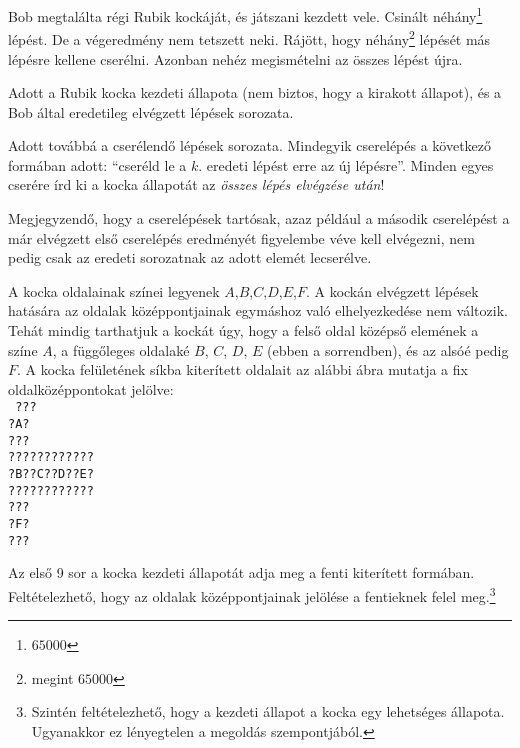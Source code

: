 





Bob megtalálta régi Rubik kockáját, és játszani kezdett vele. Csinált néhány\footnote{$65000$} lépést. De a végeredmény nem tetszett neki. Rájött, hogy néhány\footnote{megint $65000$} lépését más lépésre kellene cserélni. Azonban nehéz megismételni az összes lépést újra.


Adott a Rubik kocka kezdeti állapota (nem biztos, hogy a kirakott állapot), és a Bob által eredetileg elvégzett lépések sorozata.

Adott továbbá a cserélendő lépések sorozata. Mindegyik cserelépés a következő formában adott: ``cseréld le a $k$. eredeti lépést erre az új lépésre''. Minden egyes cserére írd ki a kocka állapotát az \emph{összes lépés elvégzése után}!

Megjegyzendő, hogy a cserelépések tartósak, azaz például a második cserelépést a már elvégzett első cserelépés eredményét figyelembe véve kell elvégezni, nem pedig csak az eredeti sorozatnak az adott elemét lecserélve.



A kocka oldalainak színei legyenek $A$,$B$,$C$,$D$,$E$,$F$. A kockán elvégzett lépések hatására az oldalak közép\-pontjainak egymáshoz való elhelyezkedése nem változik. Tehát mindig tarthatjuk a kockát úgy, hogy a felső oldal középső elemének a színe $A$, a függőleges oldalaké $B$, $C$, $D$, $E$ (ebben a sorrendben), és az alsóé pedig $F$. A kocka felületének síkba kiterített oldalait az alábbi ábra mutatja a fix oldalközéppontokat jelölve:\\
\texttt{
???\\
?A?\\
???\\
????????????\\
?B??C??D??E?\\
????????????\\
???\\
?F?\\
???\\
}


Az első 9 sor a kocka kezdeti állapotát adja meg a fenti kiterített formában. Feltételezhető, hogy az oldalak középpontjainak jelölése a fentieknek felel meg.\footnote{Szintén feltételezhető, hogy a kezdeti állapot a kocka egy lehetséges állapota. Ugyanakkor ez lényegtelen a megoldás szempontjából.}


